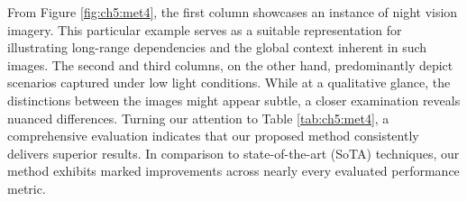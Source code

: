 From Figure \ref{fig:ch5:met4}, the first column showcases an instance of night vision imagery. This particular example serves as a suitable representation for illustrating long-range dependencies and the global context inherent in such images. The second and third columns, on the other hand, predominantly depict scenarios captured under low light conditions. While at a qualitative glance, the distinctions between the images might appear subtle, a closer examination reveals nuanced differences. Turning our attention to Table \ref{tab:ch5:met4}, a comprehensive evaluation indicates that our proposed method consistently delivers superior results. In comparison to state-of-the-art (SoTA) techniques, our method exhibits marked improvements across nearly every evaluated performance metric.

